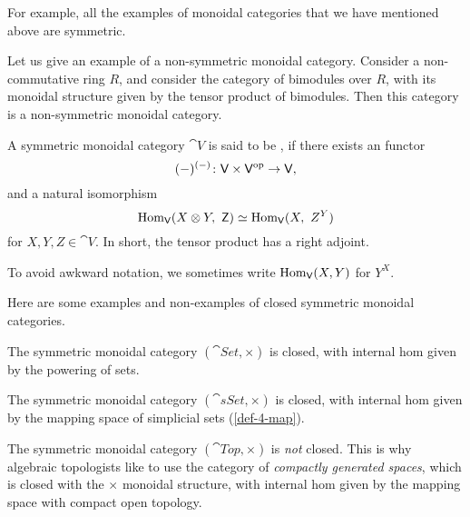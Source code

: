 For example, all the examples of monoidal categories
that we have mentioned above are symmetric.

\begin{example}
    Let us give an example of a non-symmetric monoidal category.
    Consider a non-commutative ring $R$,
    and consider the category of bimodules over $R$,
    with its monoidal structure given by the tensor product of bimodules.
    Then this category is a non-symmetric monoidal category.
    \varqed
\end{example}

\begin{definition}
    A symmetric monoidal category $\cat{V}$ is said to be ,
    if there exists an  functor 
    \[ (-)^{(-)} \colon \mathsf{V} \times \mathsf{V}^{\mathrm{op}} \to \mathsf{V}, \]
    and a natural isomorphism 
    \[ \operatorname{Hom}_{\mathsf{V}}(X \otimes Y,\ \mathsf{Z}) \simeq 
    \operatorname{Hom}_{\mathsf{V}}(X,\ Z^Y) \]
    for $X,Y,Z\in\cat{V}$.
    In short, the tensor product has a right adjoint.
\end{definition}

To avoid awkward notation,
we sometimes write $\operatorname{Hom}_{\mathsf{V}}(X,Y)$ for $Y^X$.

\begin{example}
    Here are some examples and non-examples of closed symmetric monoidal categories.
    \begin{itms}
        \item The symmetric monoidal category $(\cat{Set},\times)$ is closed,
        with internal hom given by the powering of sets.

        \item The symmetric monoidal category $(\cat{sSet},\times)$ is closed,
        with internal hom given by the mapping space of simplicial sets (\ref{def-4-map}).

        \item The symmetric monoidal category $(\cat{Top},\times)$ is \emph{not} closed.
        This is why algebraic topologists like to use the category of
        \emph{compactly generated spaces}, which is closed with the $\times$ monoidal structure,
        with internal hom given by the mapping space with compact open topology. \varqed
    \end{itms}
\end{example}

